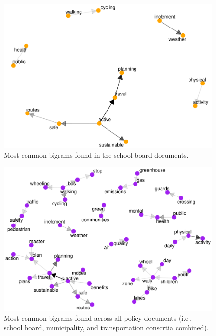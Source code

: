\documentclass[]{elsarticle} %
\begin{document}
\begin{figure}

{\centering \includegraphics[width=1\linewidth]{AST-Framing-Ontario_files/figure-latex/school-visual-1} 

}

\caption{\label{fig:school-visual}Most common bigrams found in the school board documents.}\label{fig:school-visual}
\end{figure}

\begin{figure}

{\centering \includegraphics[width=1\linewidth]{AST-Framing-Ontario_files/figure-latex/policy-visual-1} 

}

\caption{\label{fig:policy-visual}Most common bigrams found across all policy documents (i.e., school board, municipality, and transportation consortia combined).}\label{fig:policy-visual}
\end{figure}
\end{document}
